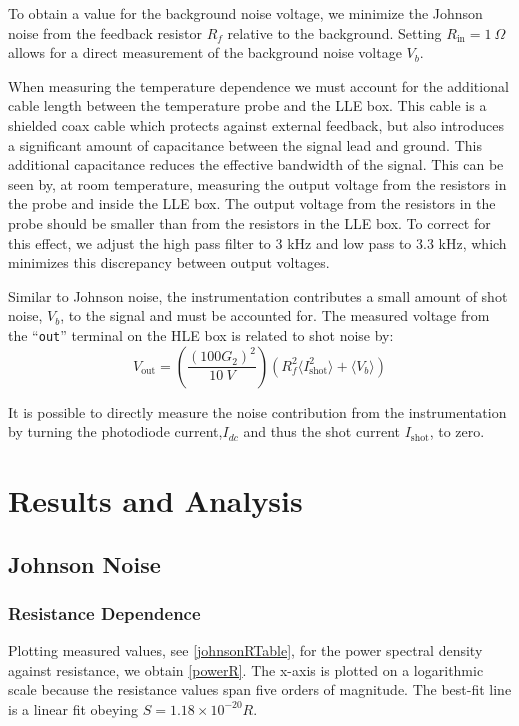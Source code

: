 \documentclass[12pt]{article}
\begin{document}
	To obtain a value for the background noise voltage, we minimize the Johnson noise from the feedback resistor $R_f$ relative to the background. Setting $R_{\text{in}} = 1 \ \Omega$ allows for a direct measurement of the background noise voltage $V_{b}$.
	
	When measuring the temperature dependence we must account for the additional cable length between the temperature probe and the LLE box. This cable is a shielded coax cable which protects against external feedback, but also introduces a significant amount of capacitance between the signal lead and ground. This additional capacitance reduces the effective bandwidth of the signal. This can be seen by, at room temperature, measuring the output voltage from the resistors in the probe and inside the LLE box. The output voltage from the resistors in the probe should be smaller than from the resistors in the LLE box. To correct for this effect, we adjust the high pass filter to $3$ kHz and low pass to $3.3$ kHz, which minimizes this discrepancy between output voltages.
	
	Similar to Johnson noise, the instrumentation contributes a small amount of shot noise, $V_b$, to the signal and must be accounted for. The measured voltage from the ``\texttt{out}'' terminal on the HLE box is related to shot noise by:
	\begin{equation}
		V_{\text{out}} = \left( \frac{(100G_2)^2}{10 \ V} \right) \left( R_f^2\langle I^2_{\text{shot}} \rangle + \langle V_b \rangle \right)
	\end{equation}
	
	It is possible to directly measure the noise contribution from the instrumentation by turning the photodiode current,$I_{dc}$ and thus the shot current $I_{\text{shot}}$, to zero.
	
	\section{Results and Analysis}

	\subsection{Johnson Noise}
	\subsubsection*{Resistance Dependence}
	Plotting measured values, see \cref{johnsonRTable}, for the power spectral density against resistance, we obtain \cref{powerR}. The x-axis is plotted on a logarithmic scale because the resistance values span five orders of magnitude. The best-fit line is a linear fit obeying $S = 1.18\times 10^{-20}R$.
	
\end{document}
